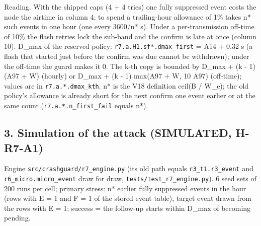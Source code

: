 Reading. With the shipped caps (4 + 4 tries) one fully suppressed event costs the node the airtime in column 4; to spend a trailing-hour allowance of 1\% takes n* such events in one hour (one every 3600/n* s). Under a per-transmission off-time of 10\% the flash retries lock the sub-band and the confirm is late at once (column 10). D\_max of the reserved policy: \texttt{r7.a.H1.sf*.dmax\_first} = A14 + 0.32 s (a flash that started just before the confirm was due cannot be withdrawn); under the off-time the guard makes it 0. The k-th copy is bounded by D\_max + (k - 1)(A97 + W) (hourly) or D\_max + (k - 1) max(A97 + W, 10 A97) (off-time); values are in \texttt{r7.a.*.dmax\_kth}. n* is the V18 definition ceil(B / W\_e); the old policy's allowance is already short for the next confirm one event earlier or at the same count (\texttt{r7.a.*.n\_first\_fail} equals n*).

\subsection*{3. Simulation of the attack (SIMULATED, H-R7-A1)}

Engine \texttt{src/crashguard/r7\_engine.py} (its old path equals \texttt{r3\_t1.r3\_event} and \texttt{r6\_micro.micro\_event} draw for draw, \texttt{tests/test\_r7\_engine.py}). 6 seed sets of 200 runs per cell; primary stress: n* earlier fully suppressed events in the hour (rows with E = 1 and F = 1 of the stored event table), target event drawn from the rows with E = 1; success = the follow-up starts within D\_max of becoming pending.

